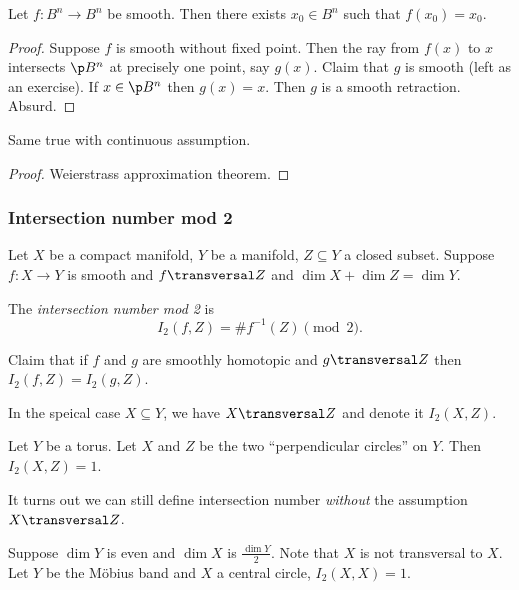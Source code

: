 \documentclass[a4paper]{article}
\begin{document}
\begin{corollary}
  Let \(f: B^n \to B^n\) be smooth. Then there exists \(x_0 \in B^n\) such that \(f(x_0) = x_0\).
\end{corollary}

\begin{proof}
  Suppose \(f\) is smooth without fixed point. Then the ray from \(f(x)\) to \(x\) intersects \(\p B^n\) at precisely one point, say \(g(x)\). Claim that \(g\) is smooth (left as an exercise). If \(x \in \p B^n\) then \(g(x) = x\). Then \(g\) is a smooth retraction. Absurd.
\end{proof}

\begin{corollary}
  Same true with continuous assumption.
\end{corollary}

\begin{proof}
  Weierstrass approximation theorem.
\end{proof}

\subsubsection{Intersection number mod 2}

Let \(X\) be a compact manifold, \(Y\) be a manifold, \(Z \subseteq Y\) a closed subset. Suppose \(f: X \to Y\) is smooth and \(f \transversal Z\) and \(\dim X + \dim Z = \dim Y\).

\begin{definition}
  The \emph{intersection number mod 2} is
  \[
    I_2(f, Z) = \# f^{-1}(Z) \pmod 2.
  \]
\end{definition}

Claim that if \(f\) and \(g\) are smoothly homotopic and \(g \transversal Z\) then \(I_2(f, Z) = I_2(g, Z)\).

In the speical case \(X \subseteq Y\), we have \(X \transversal Z\) and denote it \(I_2(X, Z)\).

\begin{eg}
  Let \(Y\) be a torus. Let \(X\) and \(Z\) be the two ``perpendicular circles'' on \(Y\). Then \(I_2(X, Z) = 1\).
\end{eg}

It turns out we can still define intersection number \emph{without} the assumption \(X \transversal Z\).

\begin{eg}
  Suppose \(\dim Y\) is even and \(\dim X\) is \(\frac{\dim Y}{2}\). Note that \(X\) is not transversal to \(X\). Let \(Y\) be the Möbius band and \(X\) a central circle, \(I_2(X, X) = 1\).
\end{eg}
\end{document}
